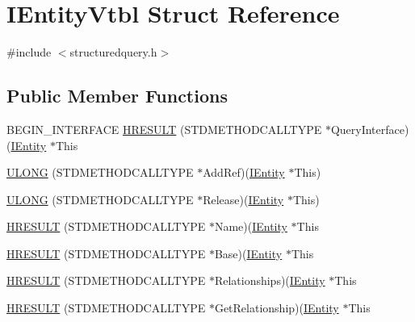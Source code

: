 \hypertarget{struct_i_entity_vtbl}{}\section{I\+Entity\+Vtbl Struct Reference}
\label{struct_i_entity_vtbl}


{\ttfamily \#include $<$structuredquery.\+h$>$}

\subsection*{Public Member Functions}
\begin{DoxyCompactItemize}
\item 
B\+E\+G\+I\+N\+\_\+\+I\+N\+T\+E\+R\+F\+A\+CE \hyperlink{struct_i_entity_vtbl_aa391db7249a7325fba40ce3c3c6e95b2}{H\+R\+E\+S\+U\+LT} (S\+T\+D\+M\+E\+T\+H\+O\+D\+C\+A\+L\+L\+T\+Y\+PE $\ast$Query\+Interface)(\hyperlink{structuredquery_8h_a9dd08456b6bfe208b5aa2ea5c533b490}{I\+Entity} $\ast$This
\item 
\hyperlink{struct_i_entity_vtbl_a149ed03da292bd3dfab9e014794a2914}{U\+L\+O\+NG} (S\+T\+D\+M\+E\+T\+H\+O\+D\+C\+A\+L\+L\+T\+Y\+PE $\ast$Add\+Ref)(\hyperlink{structuredquery_8h_a9dd08456b6bfe208b5aa2ea5c533b490}{I\+Entity} $\ast$This)
\item 
\hyperlink{struct_i_entity_vtbl_a9fe1c4fe46cfe517bb3a53398f4a910f}{U\+L\+O\+NG} (S\+T\+D\+M\+E\+T\+H\+O\+D\+C\+A\+L\+L\+T\+Y\+PE $\ast$Release)(\hyperlink{structuredquery_8h_a9dd08456b6bfe208b5aa2ea5c533b490}{I\+Entity} $\ast$This)
\item 
\hyperlink{struct_i_entity_vtbl_a0dcdd96064e2bfc71d056cb148d9d680}{H\+R\+E\+S\+U\+LT} (S\+T\+D\+M\+E\+T\+H\+O\+D\+C\+A\+L\+L\+T\+Y\+PE $\ast$Name)(\hyperlink{structuredquery_8h_a9dd08456b6bfe208b5aa2ea5c533b490}{I\+Entity} $\ast$This
\item 
\hyperlink{struct_i_entity_vtbl_ab7f6a8bb87d7d216d78958ddd42f70f8}{H\+R\+E\+S\+U\+LT} (S\+T\+D\+M\+E\+T\+H\+O\+D\+C\+A\+L\+L\+T\+Y\+PE $\ast$Base)(\hyperlink{structuredquery_8h_a9dd08456b6bfe208b5aa2ea5c533b490}{I\+Entity} $\ast$This
\item 
\hyperlink{struct_i_entity_vtbl_a0abacc7d5af04ebcfc054b9de47ef5c0}{H\+R\+E\+S\+U\+LT} (S\+T\+D\+M\+E\+T\+H\+O\+D\+C\+A\+L\+L\+T\+Y\+PE $\ast$Relationships)(\hyperlink{structuredquery_8h_a9dd08456b6bfe208b5aa2ea5c533b490}{I\+Entity} $\ast$This
\item 
\hyperlink{struct_i_entity_vtbl_a098b1f757b88078a3fc0915717d543ba}{H\+R\+E\+S\+U\+LT} (S\+T\+D\+M\+E\+T\+H\+O\+D\+C\+A\+L\+L\+T\+Y\+PE $\ast$Get\+Relationship)(\hyperlink{structuredquery_8h_a9dd08456b6bfe208b5aa2ea5c533b490}{I\+Entity} $\ast$This

\end{DoxyCompactItemize}
